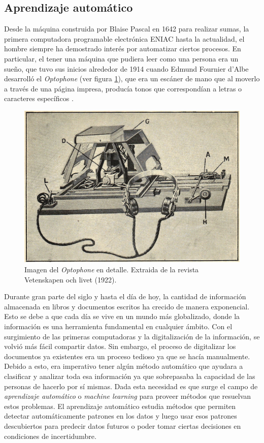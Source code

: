 \subsection{Aprendizaje automático}

	Desde la máquina construida por Blaise Pascal en 1642 para realizar sumas, la primera computadora programable electrónica ENIAC hasta la actualidad, el hombre siempre ha demostrado interés por automatizar ciertos procesos. En particular, el tener una máquina que pudiera leer como una persona era un sueño, que tuvo sus inicios alrededor de 1914 cuando Edmund Fournier d'Albe desarrolló el \textit{Optophone} (ver figura \ref{fig: Optophone}), que era un escáner de mano que al moverlo a través de una página impresa, producía tonos que correspondían	a letras o caracteres específicos \cite{EFdAlbe}.

			\begin{figure}[htbp]
				\centering
				\centerline{
					\includegraphics[scale=1]{img/Optophone.jpg}
				}
				\caption[Optophone]{Imagen del \textit{Optophone} en detalle. Extraida de la revista Vetenskapen och livet (1922).}
				\label{fig: Optophone}
			\end{figure}
			
	Durante gran parte del siglo  y hasta el día de hoy, la cantidad de información almacenada en libros y documentos escritos ha crecido de manera exponencial. Esto se debe a que cada día se vive en un mundo más globalizado, donde la información es una herramienta fundamental en cualquier ámbito. Con el surgimiento de las primeras computadoras y la digitalización de la información, se volvió más fácil compartir datos. Sin embargo, el proceso de digitalizar los documentos ya existentes era un proceso tedioso ya que se hacía manualmente. Debido a esto, era imperativo tener algún método automático que ayudara a clasificar y analizar toda esa información ya que sobrepasaba la capacidad de las personas de hacerlo por sí mismas. Dada esta necesidad es que surge el campo de \textit{aprendizaje automático} o \textit{machine learning} para proveer métodos que resuelvan estos problemas. El aprendizaje automático estudia métodos que permiten detectar automáticamente patrones en los datos y luego usar esos patrones descubiertos para predecir datos futuros o poder tomar ciertas decisiones en condiciones de incertidumbre. 
	
